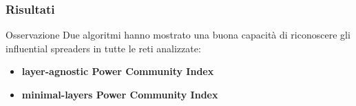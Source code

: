 \begin{frame}
    \frametitle{Risultati}
    \begin{center}
\end{center}



    \begin{block}{Osservazione}
        Due algoritmi hanno mostrato una buona capacità di riconoscere gli
        influential spreaders in tutte le reti analizzate:
        \begin{itemize}
          \item \textbf<2->{layer-agnostic Power Community Index}
          \item \textbf<2->{minimal-layers Power Community Index}
        \end{itemize}
     \end{block}
  
    
\end{frame}